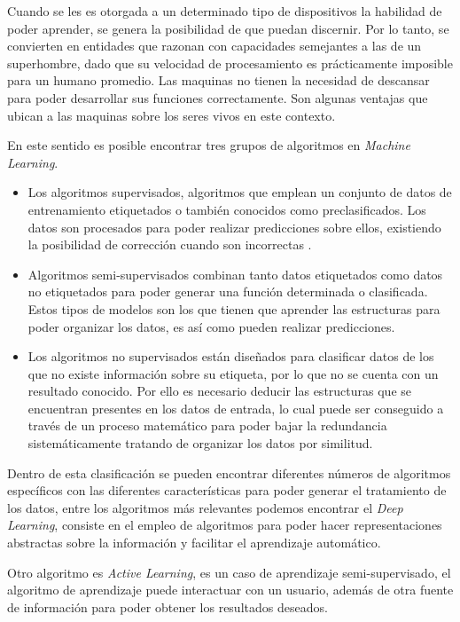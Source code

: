 Cuando se les es otorgada a un determinado tipo de dispositivos la habilidad de poder aprender, se genera la posibilidad de que puedan discernir. Por lo tanto, se convierten en entidades que razonan con capacidades semejantes a las de un superhombre, dado que su velocidad de procesamiento es prácticamente imposible para un humano promedio. Las maquinas no tienen la necesidad de descansar para poder desarrollar sus funciones correctamente. Son algunas ventajas que ubican a las maquinas sobre los seres vivos en este contexto.

En este sentido es posible encontrar tres grupos de algoritmos en \textit{Machine Learning}.

\begin{itemize}
\item Los algoritmos supervisados, algoritmos que emplean un conjunto de datos de entrenamiento etiquetados o también conocidos como preclasificados. Los datos son procesados para poder realizar predicciones sobre ellos, existiendo la posibilidad de corrección cuando son incorrectas \cite{RussoC2016}. 

\item Algoritmos semi-supervisados combinan tanto datos etiquetados como datos no etiquetados para poder generar una función determinada o clasificada. Estos tipos de modelos son los que tienen que aprender las estructuras para poder organizar los datos, es así como pueden realizar predicciones.

\item Los algoritmos no supervisados están diseñados para clasificar datos de los que no existe información sobre su etiqueta, por lo que no se cuenta con un resultado conocido. Por ello es necesario deducir las estructuras que se encuentran presentes en los datos de entrada, lo cual puede ser conseguido a través de un proceso matemático para poder bajar la redundancia sistemáticamente tratando de organizar los datos por similitud.
\end{itemize}

Dentro de esta clasificación se pueden encontrar diferentes números de algoritmos específicos con las diferentes características para poder generar el tratamiento de los datos, entre los algoritmos más relevantes podemos encontrar el \textit{Deep Learning}, consiste en el empleo de algoritmos para poder hacer representaciones abstractas sobre la información y facilitar el aprendizaje automático. 

Otro algoritmo es \textit{Active Learning}, es un caso de aprendizaje semi-supervisado, el algoritmo de aprendizaje puede interactuar con un usuario, además de otra fuente de información para poder obtener los resultados deseados.

